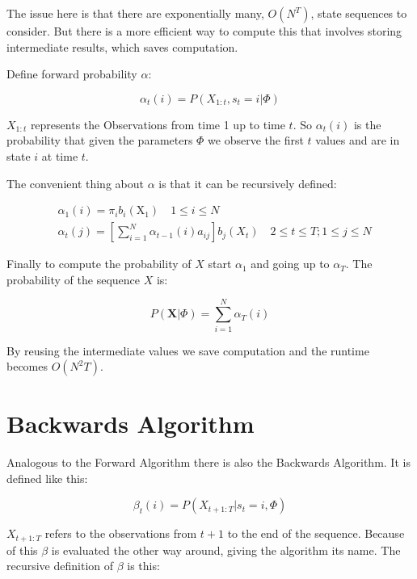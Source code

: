 The issue here is that there are exponentially many, $O(N^{T})$, state sequences to consider. But there is a more efficient way to compute this that involves storing intermediate results, which saves computation. 

Define forward probability $\alpha$:

\begin{equation}
   \alpha_{t}(i)=P\left(X_{1:t}, s_{t}=i | \Phi\right) 
\end{equation}

$X_{1:t}$ represents the Observations from time 1 up to time $t$. So $\alpha_{t}(i)$ is the probability that given the parameters $\Phi$ we observe the first $t$ values and are in state $i$ at time $t$.

The convenient thing about $\alpha$ is that it can be recursively defined:

\begin{equation}
\begin{aligned}
&\alpha_{1}(i)=\pi_{i} b_{i}\left(\mathrm{X}_{1}\right) \quad 1 \leq i \leq N \\
&\alpha_{t}(j)=\left[\sum_{i=1}^{N} \alpha_{t-1}(i) a_{i j}\right] b_{j}\left(X_{t}\right) \quad 2 \leq t \leq T ; 1 \leq j \leq N
\end{aligned}
\label{eq:alpha-def}
\end{equation}


Finally to compute the probability of $X$ start $\alpha_1$ and going up to $\alpha_T$. The probability of the sequence $X$ is:

\begin{equation}
   P(\mathbf{X} | \Phi)=\sum_{i=1}^{N} \alpha_{T}(i) 
  \label{eq:prop-statement}
\end{equation}

By reusing the intermediate values we save computation and the runtime becomes $O(N^2 T)$.

\section{Backwards Algorithm}

Analogous to the Forward Algorithm there is also the Backwards Algorithm. It is defined like this:

\begin{equation}
   \beta_{t}(i)=P\left(X_{t+1:T} | s_{t}=i, \Phi\right) 
\end{equation}

$X_{t+1:T}$ refers to the observations from $t+1$ to the end of the sequence. Because of this $\beta$ is evaluated the other way around, giving the algorithm its name. The recursive definition of $\beta$ is this:

